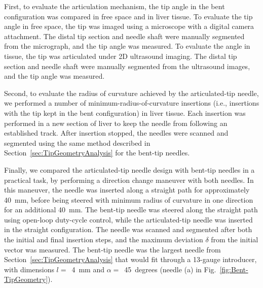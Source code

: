 First, to evaluate the articulation mechanism, the tip angle in the bent configuration was compared in free space and in liver tissue. To evaluate the tip angle in free space, the tip was imaged using a microscope with a digital camera attachment. The distal tip section and needle shaft were manually segmented from the micrograph, and the tip angle was measured. To evaluate the angle in tissue, the tip was articulated under 2D ultrasound imaging. The distal tip section and needle shaft were manually segmented from the ultrasound images, and the tip angle was measured.

Second, to evaluate the radius of curvature achieved by the articulated-tip needle, we performed a number of minimum-radius-of-curvature insertions (i.e., insertions with the tip kept in the bent configuration) in liver tissue. Each insertion was performed in a new section of liver to keep the needle from following an established track. After insertion stopped, the needles were scanned and segmented using the same method described in Section~\ref{sec:TipGeometryAnalysis} for the bent-tip needles.

Finally, we compared the articulated-tip needle design with bent-tip needles in a practical task, by performing a direction change maneuver with both needles. In this maneuver, the needle was inserted along a straight path for approximately 40~mm, before being steered with minimum radius of curvature in one direction for an additional 40~mm. The bent-tip needle was steered along the straight path using open-loop duty-cycle control, while the articulated-tip needle was inserted in the straight configuration. The needle was scanned and segmented after both the initial and final insertion steps, and the maximum deviation $\delta$ from the initial vector was measured. The bent-tip needle was the largest needle from Section~\ref{sec:TipGeometryAnalysis} that would fit through a 13-gauge introducer, with dimensions $l =$~4~mm and $\alpha =$~45~degrees (needle (a) in Fig.~\ref{fig:Bent-TipGeometry}).  

